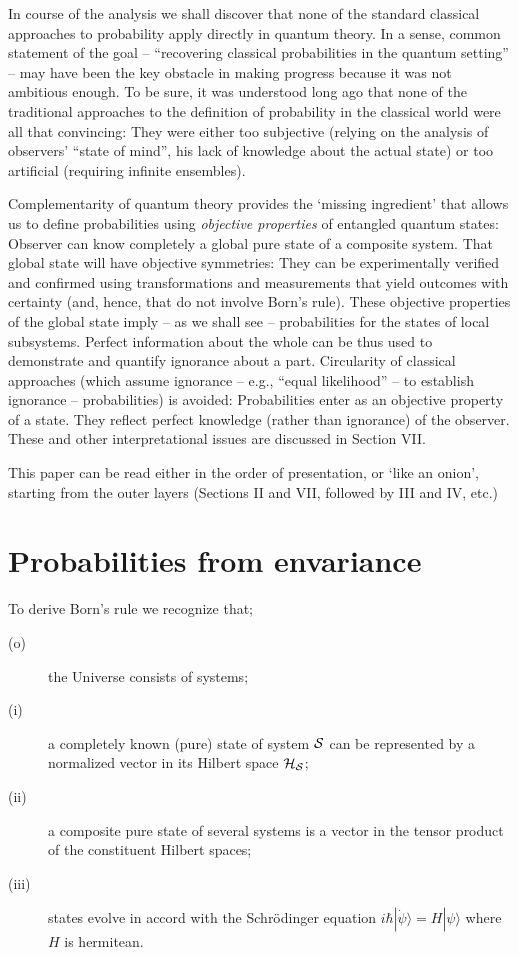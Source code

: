 \documentclass[aps,pra,epsfig,11pt,floatfix]{revtex4}
\begin{document}
In course of the analysis we shall discover that none of the standard classical
approaches to probability apply directly in quantum theory. In a sense,  common
statement of the goal -- ``recovering classical probabilities in the quantum
setting'' -- may have been the key obstacle in making progress because it
was not ambitious enough. To be sure, it was understood long ago that none of
the traditional approaches to the definition of probability in the classical
world were all that convincing: They were either too subjective (relying
on the analysis of observers'  ``state of mind'', his lack of knowledge 
about the actual state) or too artificial (requiring infinite ensembles).

Complementarity of quantum theory provides the `missing ingredient' that
allows us to define probabilities using {\it objective properties} of entangled 
quantum states: Observer can know completely a global pure state of 
a composite system. That global state will have objective symmetries: They can be
experimentally verified and confirmed using transformations and measurements
that yield outcomes with certainty (and, hence, that do not involve Born's rule).
These objective properties of the global state imply -- as we shall see --
probabilities for the states of  local subsystems. Perfect information about the whole
can be thus used to demonstrate and quantify ignorance about a part. Circularity
of classical approaches (which assume ignorance -- e.g., ``equal likelihood'' -- to
establish ignorance -- probabilities) is avoided: Probabilities enter as an objective
property of a state. They reflect perfect knowledge (rather than ignorance) of 
the observer. These and other interpretational issues are discussed
in Section VII.

This paper can be read either in the order of presentation, or `like an onion',
starting from the outer layers (Sections II and VII, followed by III and IV, etc.)

\section{Probabilities from envariance}

To derive Born's rule we recognize that;
\begin{description}
\item[(o)] the Universe consists of systems;
\item[(i)] a completely known (pure) state of system ${\cal S}$ can
be represented by  a normalized vector in its Hilbert space ${\cal H_S}$;
\item[(ii)] a composite pure state of several systems is a vector
in the tensor product of the constituent Hilbert spaces;
\item[(iii)] states evolve in accord with the Schr\"odinger
equation $i \hbar |\dot \psi \rangle = H |\psi\rangle$ where $H$ is hermitean.
\end{description}
\end{document}
